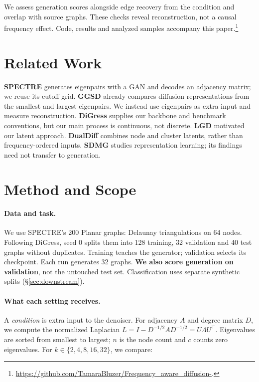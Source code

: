 \documentclass[11pt]{article}
\begin{document}
We assess generation scores alongside edge recovery from the condition and overlap with
source graphs. These checks reveal reconstruction, not a causal frequency effect.
Code, results and analyzed samples accompany this paper.\footnote{\url{https://github.com/TamaraBluzer/Frequency_aware_diffusion-}.}

\section{Related Work}
\label{sec:related}
\textbf{SPECTRE} \citep{martinkus2022spectre} generates eigenpairs with a GAN and decodes an
adjacency matrix; we reuse its cutoff grid. \textbf{GGSD} \citep{minello2025ggsd} already
compares diffusion representations from the smallest and largest eigenpairs. We instead use
eigenpairs as extra input and measure reconstruction. \textbf{DiGress}
\citep{vignac2023digress} supplies our backbone and benchmark conventions, but our main
process is continuous, not discrete. \textbf{LGD} \citep{zhou2024lgd} motivated our latent
approach. \textbf{DualDiff} \citep{xie2026dualdiff} combines node and cluster latents, rather
than frequency-ordered inputs. \textbf{SDMG} \citep{zhu2025sdmg} studies representation learning;
its findings need not transfer to generation.

\section{Method and Scope}
\label{sec:method}
\paragraph{Data and task.} We use SPECTRE's 200 Planar graphs: Delaunay triangulations on
64 nodes. Following DiGress, seed 0 splits them into 128 training, 32 validation and 40 test
graphs without duplicates. Training teaches the generator; validation selects its checkpoint.
Each run generates 32 graphs. \textbf{We also score generation on validation}, not the untouched
test set. Classification uses separate synthetic splits (\S\ref{sec:downstream}).

\paragraph{What each setting receives.} A \emph{condition} is extra input to the denoiser.
For adjacency $A$ and degree matrix $D$, we compute the normalized Laplacian
$L=I-D^{-1/2}AD^{-1/2}=U\Lambda U^\top$. Eigenvalues are sorted from smallest to largest;
$n$ is the node count and $c$ counts zero eigenvalues. For $k\in\{2,4,8,16,32\}$, we compare:
\end{document}
